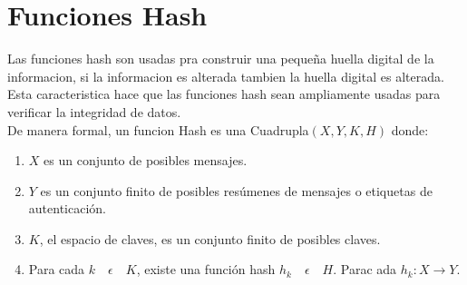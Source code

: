 \documentclass[12pt,oneside,onecolumn,openany]{report}
\begin{document}
\section{Funciones Hash}
Las funciones hash son usadas pra construir una pequeña huella digital de la informacion, si la informacion es alterada tambien la huella digital es alterada. Esta caracteristica hace que las funciones hash sean ampliamente usadas para verificar la integridad de datos.\\
De manera formal, un funcion Hash es una Cuadrupla$(X,Y,K,H)$ donde:
\begin{enumerate}
 \item $X$ es un conjunto de posibles mensajes.
 \item $Y$ es un conjunto finito de posibles resúmenes de mensajes o etiquetas de autenticación.
 \item $K$, el espacio de claves, es un conjunto finito de posibles claves.
 \item Para cada $k\quad \epsilon\quad K$, existe una función hash $h_k\quad \epsilon\quad H$. Parac ada $h_k: X \longrightarrow Y$.
 \cite{stin}
\end{enumerate}
\end{document}
